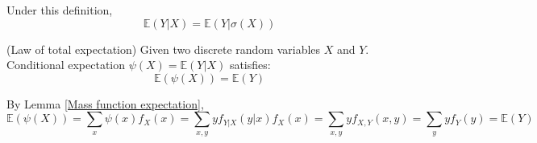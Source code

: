 \documentclass{huhtakm-template-book}
\newcommand{\expect}{\mathbb{E}}
\begin{document}
    \begin{rem}
        Under this definition,
        \begin{equation*}
            \expect(Y|X)=\expect(Y|\sigma(X))
        \end{equation*}
    \end{rem}
    \begin{thm}(Law of total expectation)
    Given two discrete random variables $X$ and $Y$. Conditional expectation $\psi(X)=\expect(Y|X)$ satisfies:
        \begin{equation*}
            \expect(\psi(X))=\expect(Y)
        \end{equation*}
    \end{thm}
    \begin{proofing}
        By Lemma \ref{Mass function expectation},
        \begin{equation*}
            \expect(\psi(X))=\sum_{x}\psi(x)f_{X}(x)=\sum_{x,y}yf_{Y|X}(y|x)f_{X}(x)=\sum_{x,y}yf_{X,Y}(x,y)=\sum_{y}yf_{Y}(y)=\expect(Y)
        \end{equation*}
    \end{proofing}
\end{document}
